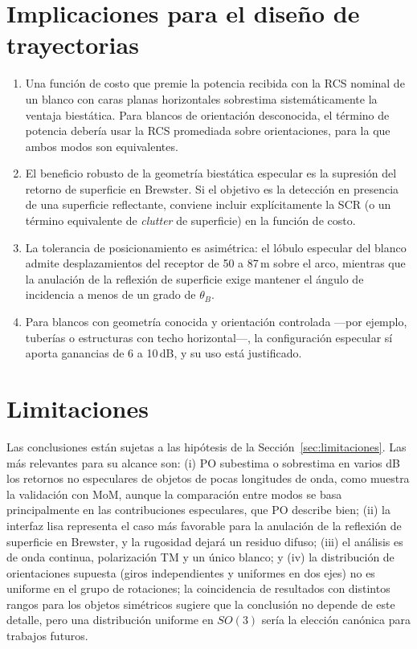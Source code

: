 \documentclass[11pt,a4paper]{report}
\begin{document}
\section{Implicaciones para el diseño de trayectorias}

\begin{enumerate}[itemsep=3pt]
  \item Una función de costo que premie la potencia recibida con la RCS
  nominal de un blanco con caras planas horizontales sobrestima
  sistemáticamente la ventaja biestática. Para blancos de orientación
  desconocida, el término de potencia debería usar la RCS promediada sobre
  orientaciones, para la que ambos modos son equivalentes.
  \item El beneficio robusto de la geometría biestática especular es la
  supresión del retorno de superficie en Brewster. Si el objetivo es la
  detección en presencia de una superficie reflectante, conviene incluir
  explícitamente la SCR (o un término equivalente de \emph{clutter} de
  superficie) en la función de costo.
  \item La tolerancia de posicionamiento es asimétrica: el lóbulo especular
  del blanco admite desplazamientos del receptor de 50 a 87\,m sobre el arco,
  mientras que la anulación de la reflexión de superficie exige mantener el
  ángulo de incidencia a menos de un grado de $\theta_B$.
  \item Para blancos con geometría conocida y orientación controlada
  ---por ejemplo, tuberías o estructuras con techo horizontal---, la
  configuración especular sí aporta ganancias de 6 a 10\,dB, y su uso está
  justificado.
\end{enumerate}

\section{Limitaciones}

Las conclusiones están sujetas a las hipótesis de la
Sección~\ref{sec:limitaciones}. Las más relevantes para su alcance son: (i)
PO subestima o sobrestima en varios dB los retornos no especulares de
objetos de pocas longitudes de onda, como muestra la validación con MoM,
aunque la comparación entre modos se basa principalmente en las
contribuciones especulares, que PO describe bien; (ii) la interfaz lisa
representa el caso más favorable para la anulación de la reflexión de
superficie en Brewster, y la rugosidad dejará un residuo difuso; (iii) el
análisis es de onda continua, polarización TM y un único blanco; y (iv) la
distribución de orientaciones supuesta (giros independientes y uniformes en
dos ejes) no es uniforme en el grupo de rotaciones; la coincidencia de
resultados con distintos rangos para los objetos simétricos sugiere que la
conclusión no depende de este detalle, pero una distribución uniforme en
$SO(3)$ sería la elección canónica para trabajos futuros.
\end{document}
